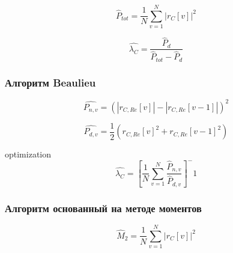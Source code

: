 \begin{center}
\begin{equation}
	\hat P_{tot} = \frac{1}{N} \sum \limits_{v=1}^{N} \left|r_C[v] \right| ^2
\end{equation}
\end{center}

\begin{center}
\begin{equation}
	\hat{\lambda_C} = \frac{\hat P_d}{\hat P_{tot} - \hat P_d}
\end{equation}
\end{center}

\subsubsection{Алгоритм Beaulieu}
\begin{center}
\begin{equation}
	\hat{P_{n,v}} = (\left| r_{C,Re}[v] \right| - \left| r_{C,Re}[v-1] \right|)^2
\end{equation}
\end{center}

\begin{center}
\begin{equation}
	\hat{P_{d,v}} = \frac{1}{2}(r_{C,Re}[v]^2 + r_{C,Re}[v-1]^2)
\end{equation}
\end{center}

\begin{center}optimization
\begin{equation}
	\hat{\lambda_C} = [ \frac{1}{N} \sum \limits_{v=1}^{N} \frac{\hat P_{n,v}}{\hat P_{d,v}} ]^-1
\end{equation}
\end{center}

\subsubsection{Алгоритм основанный на методе моментов}
\begin{center}
\begin{equation}
	\hat M_2 = \frac{1}{N} \sum \limits_{v=1}^{N} \left|r_C[v] \right| ^2
\end{equation}
\end{center}

